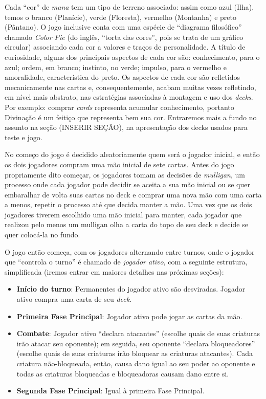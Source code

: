 \documentclass{book}
\begin{document}
Cada ``cor'' de \textit{mana} tem um tipo de terreno associado: assim
como azul (Ilha), temos o branco (Planície), verde (Floresta),
vermelho (Montanha) e preto (Pântano). O jogo inclusive conta com uma
espécie de ``diagrama filosófico'' chamado \textit{Color Pie}
(do inglês, ``torta das cores'', pois se trata de um gráfico circular)
associando cada cor a valores e traços de personalidade.
A título de curiosidade, alguns dos principais aspectos de cada cor são:
conhecimento, para o azul; ordem, em branco; instinto, no verde;
impulso, para o vermelho e amoralidade, característica do preto. Os
aspectos de cada cor são refletidos mecanicamente nas cartas e,
consequentemente, acabam muitas vezes refletindo, em nível mais
abstrato, nas estratégias associadas à montagem e uso dos
\textit{decks}.
Por exemplo: comprar \textit{cards} representa acumular conhecimento,
portanto Divinação é um feitiço que representa bem sua cor.
Entraremos mais a fundo no assunto na seção (INSERIR SEÇÂO), na
apresentação dos decks usados para teste e jogo.

No começo do jogo é decidido aleatoriamente quem será o jogador inicial,
e então os dois jogadores compram uma mão inicial de sete cartas.
Antes do jogo propriamente dito começar, os jogadores tomam as decisões
de \textit{mulligan}, um processo onde cada jogador pode decidir
se aceita a sua mão inicial ou se quer embaralhar de volta suas cartas
no deck e comprar uma nova mão com uma carta a menos, repetir o processo
até que decida manter a mão. Uma vez que os dois jogadores tiverem
escolhido uma mão inicial para manter, cada jogador que realizou pelo
menos um mulligan
olha a carta do topo de seu deck e decide se quer colocá-la no fundo.

O jogo então começa, com os jogadores alternando entre turnos, onde o
jogador que ``controla o turno'' é chamado de \textit{jogador ativo},
com a seguinte estrutura, simplificada (iremos entrar em maiores
detalhes nas próximas seções):

\begin{itemize}
    \item\textbf{Início do turno}: Permanentes do jogador ativo são
desviradas. Jogador ativo compra uma carta de seu \textit{deck}.
    \item\textbf{Primeira Fase Principal}: Jogador ativo pode jogar as
cartas da mão.
    \item \textbf{Combate}: Jogador ativo ``declara atacantes'' (escolhe
quais de suas criaturas irão atacar seu oponente); em seguida, seu
oponente ``declara bloqueadores'' (escolhe quais de suas criaturas irão
bloquear as criaturas atacantes). Cada criatura não-bloqueada, então,
causa dano igual ao seu poder ao oponente e todas as criaturas
bloqueadas e bloqueadoras causam dano entre si.
    \item \textbf{Segunda Fase Principal}: Igual à primeira Fase
Principal.
\end{itemize}
\end{document}
